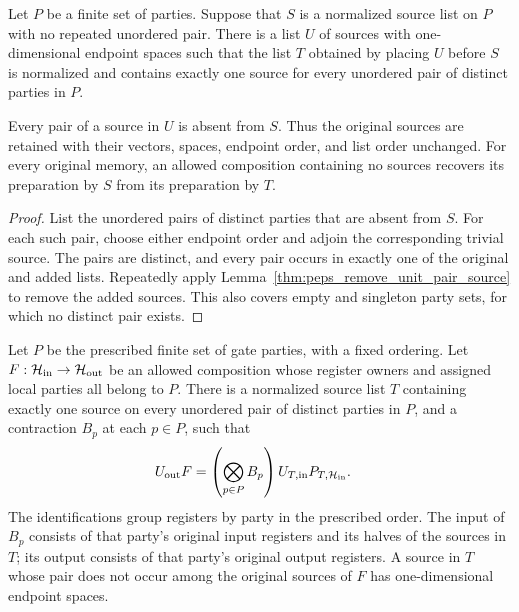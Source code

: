 \begin{lemma}
    \label{thm:peps_complete_pair_sources}
    \leanok
    Let $P$ be a finite set of parties. Suppose that $S$ is a normalized
    source list on $P$ with no repeated unordered pair. There is a list $U$
    of sources with one-dimensional endpoint spaces such that the
    list $T$ obtained by placing $U$ before $S$
    is normalized and contains exactly one source for every unordered
    pair of distinct parties in $P$.

    Every pair of a source in $U$ is absent from $S$. Thus the original
    sources are retained with their vectors, spaces, endpoint order,
    and list order unchanged. For every original memory, an allowed
    composition containing no sources recovers its preparation by $S$
    from its preparation by $T$.
\end{lemma}

\begin{proof}\leanok
    List the unordered pairs of distinct parties that are absent from
    $S$. For each such pair, choose either endpoint order and adjoin the
    corresponding trivial source. The pairs are distinct, and every pair
    occurs in exactly one of the original and added lists. Repeatedly
    apply Lemma~\ref{thm:peps_remove_unit_pair_source} to remove the
    added sources. This also covers empty and singleton party sets,
    for which no distinct pair exists.
\end{proof}

\begin{lemma}
    \label{thm:peps_complete_prepared_party_maps}
    \leanok
    Let $P$ be the prescribed finite set of gate parties, with a fixed
    ordering. Let $F:\mathcal H_{\rm in}\to\mathcal H_{\rm out}$ be an
    allowed composition whose register owners and assigned local parties
    all belong to $P$. There is a normalized source list $T$ containing
    exactly one source on every unordered pair of distinct parties in
    $P$, and a contraction $B_p$ at each $p\in P$, such that
    \begin{align}
        U_{\rm out}F
         & =\left(\bigotimes_{p\in P}B_p\right)
        U_{T,\rm in}P_{T,\mathcal H_{\rm in}}.
        \label{eq:peps_complete_prepared_party_maps}
    \end{align}
    The identifications group registers by party in the prescribed order.
    The input of $B_p$ consists of that party's original input registers
    and its halves of the sources in $T$; its output consists of that
    party's original output registers. A source in $T$ whose pair does not
    occur among the original sources of $F$ has one-dimensional endpoint
    spaces.
\end{lemma}

